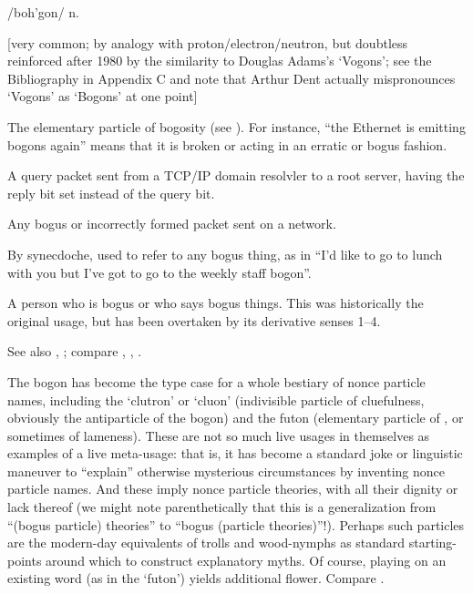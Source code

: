  /boh'gon/ n.

[very common; by analogy with proton/electron/neutron, but doubtless reinforced
after 1980 by the similarity to Douglas Adams's `Vogons'; see the
Bibliography in Appendix C and note that Arthur Dent actually mispronounces
`Vogons' as `Bogons' at one point]
\begin{inparaenum}
\item The elementary particle of bogosity (see ). For instance, ``the Ethernet is emitting bogons again''
    means that it is broken or acting in an erratic or bogus fashion.
\item A query packet sent from a TCP/IP domain resolvler to a root server,
    having the reply bit set instead of the query bit.
\item Any bogus or incorrectly formed packet sent on a network.
\item By synecdoche, used to refer to any bogus thing, as in ``I'd like to go to
    lunch with you but I've got to go to the weekly staff bogon''.
\item A person who is bogus or who says bogus things. This was historically the
    original usage, but has been overtaken by its derivative senses 1--4.
\end{inparaenum}
See also , ; compare ,
, .

The bogon has become the type case for a whole bestiary of nonce particle names,
including the `clutron' or `cluon' (indivisible particle of cluefulness,
obviously the antiparticle of the bogon) and the futon (elementary particle of
, or sometimes of lameness). These are not so much live
usages in themselves as examples of a live meta-usage: that is, it has become a
standard joke or linguistic maneuver to ``explain'' otherwise mysterious
circumstances by inventing nonce particle names. And these imply nonce particle
theories, with all their dignity or lack thereof (we might note parenthetically
that this is a generalization from ``(bogus particle) theories'' to ``bogus
(particle theories)''!). Perhaps such particles are the modern-day equivalents
of trolls and wood-nymphs as standard starting-points around which to construct
explanatory myths. Of course, playing on an existing word (as in the `futon')
yields additional flower. Compare .

